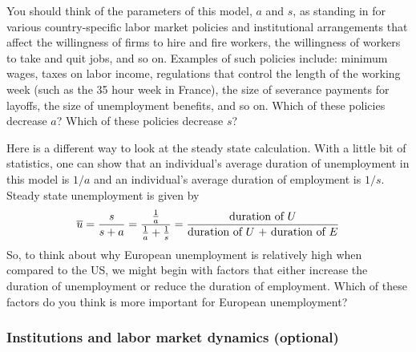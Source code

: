 \documentclass[letterpaper,12pt]{article}
\begin{document}
You should think of the parameters of this model, $a$ and $s$, as standing in for various country-specific labor market policies and institutional arrangements that affect the willingness of firms to hire and fire workers, the willingness of workers to take and quit jobs, and so on.
Examples of such policies include: minimum wages,
taxes on labor income, regulations that control the length of the working week (such as the 35 hour week in France), the size of severance payments for layoffs, the size of unemployment benefits, and so on. Which of these policies decrease $a$? Which of these policies decrease $s$?

Here is a different way to look at the steady state calculation. With a little bit of statistics, one can show that an individual's average duration of unemployment in this model is $1/a$ and an individual's average duration of employment is $1/s$. Steady state unemployment is given by
\[\overline{u} = \frac{s}{s+a} = \frac{\frac{1}{a}}{\frac{1}{a}+\frac{1}{s}}=\frac{\textmd{duration of  $U$}}{\textmd{duration of $U$ + duration of $E$}}
\]
So, to think about why European unemployment is relatively high when compared to the US, we might begin with factors that either increase the duration of unemployment or reduce the duration of employment. Which of these factors do you think is more important for European unemployment?


\subsubsection*{Institutions and labor market dynamics (optional)}
\end{document}
